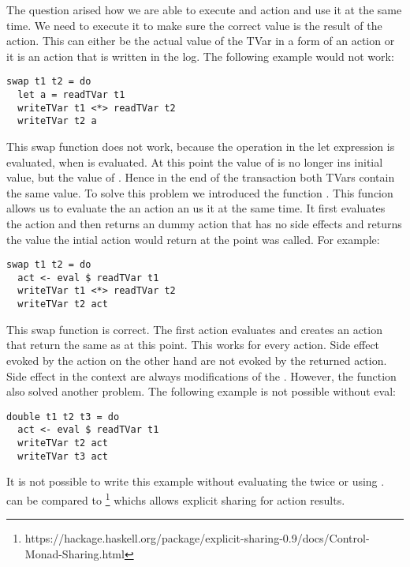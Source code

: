 The question arised how we are able to execute and action and use it at the same time. We need to execute it to make sure 
the correct value is the result of the action. This can either be the actual value of the TVar in a form of an  
action or it is an  action that is written in the log. The following example would not work:
\begin{lstlisting}
swap t1 t2 = do
  let a = readTVar t1
  writeTVar t1 <*> readTVar t2
  writeTVar t2 a
\end{lstlisting}
This swap function does not work, because the  operation in the let expression is evaluated, when 
 is evaluated. At this point the value of  is no longer ins initial value, but the 
value of . Hence in the end of the transaction both TVars contain the same value. To solve this problem
we introduced the function . This funcion allows us to evaluate the an 
 action an us it at the same time. It first evaluates the  action and then returns an 
dummy action that has no side effects and returns the value the intial action would return at the point 
was called. For example:
\begin{lstlisting}
swap t1 t2 = do
  act <- eval $ readTVar t1
  writeTVar t1 <*> readTVar t2
  writeTVar t2 act
\end{lstlisting}
This swap function is correct. The first action evaluates  and creates an action that return 
the same as  at this point. This works for every  action. Side effect evoked by the 
action on the other hand are not evoked by the returned action. Side effect in the context  are always 
modifications of the . However, the  function also solved another problem. The following
example is not possible without eval:
\begin{lstlisting}
double t1 t2 t3 = do 
  act <- eval $ readTVar t1
  writeTVar t2 act
  writeTVar t3 act
\end{lstlisting}
It is not possible to write this example without evaluating the  twice or using . 
 can be compared to \footnote{https://hackage.haskell.org/package/explicit-sharing-0.9/docs/Control-Monad-Sharing.html}
whichs allows explicit sharing for action results.

